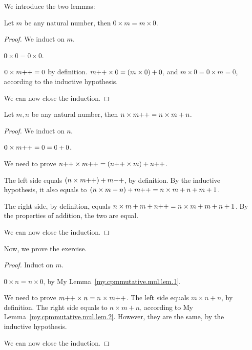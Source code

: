 We introduce the two lemmas:
\begin{lem}\label{my.cpmmutative.mul.lem.1}
	Let $m$ be any natural number, then $0 \times m = m \times 0$.
\end{lem}
\begin{proof}
	We induct on $m$.
	
	 $0 \times 0 = 0 \times 0$.
	
	 $0 \times m{+}{+} = 0$ by definition. $m{+}{+} \times 0 = (m \times 0) + 0$, and $m \times 0 = 0 \times m = 0$, according to the inductive hypothesis.
	
	We can now close the induction.
\end{proof}

\begin{lem}\label{my.cpmmutative.mul.lem.2}
	Let $m, n$ be any natural number, then $n \times m{+}{+} = n \times m + n$.
\end{lem}
\begin{proof}
	We induct on $n$.
	
	 $0 \times m{+}{+} = 0 = 0 + 0$.
	
	 We need to prove $n{+}{+} \times m{+}{+} = (n{+}{+} \times m) + n{+}{+}$.
	
	The left side equals $(n \times m{+}{+}) + m{+}{+}$, by definition. By the inductive hypothesis, it also equals to $(n \times m + n) + m{+}{+} = n \times m + n + m + 1$.
	
	The right side, by definition, equals $n \times m + m + n{+}{+} = n \times m + m +n +1$. By the properties of addition, the two are equal.
	
	We can now close the induction.
\end{proof}

Now, we prove the exercise.
\begin{proof}
	Induct on $m$.
	
	 $0 \times n = n \times 0$, by My Lemma~\ref{my.cpmmutative.mul.lem.1}.
	
	 We need to prove $m{+}{+} \times n = n \times m{+}{+}$. The left side equals $m \times n + n$, by definition. The right side equals to $n \times m + n$, according to My Lemma~\ref{my.cpmmutative.mul.lem.2}. However, they are the same, by the inductive hypothesis.
	
	We can now close the induction.
\end{proof}

